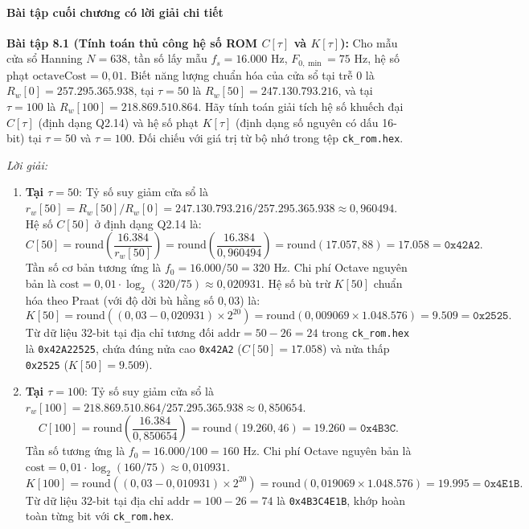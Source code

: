 \paragraph{Bài tập cuối chương có lời giải chi tiết}

\textbf{Bài tập 8.1 (Tính toán thủ công hệ số ROM $C[\tau]$ và $K[\tau]$):}
Cho mẫu cửa sổ Hanning $N = 638$, tần số lấy mẫu $f_s = 16.000\text{ Hz}$, $F_{0,\min} = 75\text{ Hz}$, hệ số phạt $\text{octaveCost} = 0{,}01$. Biết năng lượng chuẩn hóa của cửa sổ tại trễ 0 là $R_w[0] = 257.295.365.938$, tại $\tau = 50$ là $R_w[50] = 247.130.793.216$, và tại $\tau = 100$ là $R_w[100] = 218.869.510.864$. Hãy tính toán giải tích hệ số khuếch đại $C[\tau]$ (định dạng Q2.14) và hệ số phạt $K[\tau]$ (định dạng số nguyên có dấu 16-bit) tại $\tau = 50$ và $\tau = 100$. Đối chiếu với giá trị từ bộ nhớ trong tệp \texttt{ck\_rom.hex}.

\textit{Lời giải:}
\begin{enumerate}[leftmargin=1.5em]
    \item \textbf{Tại $\tau = 50$}:
    Tỷ số suy giảm cửa sổ là $r_w[50] = R_w[50] / R_w[0] = 247.130.793.216 / 257.295.365.938 \approx 0{,}960494$.
    Hệ số $C[50]$ ở định dạng Q2.14 là:
    \begin{equation}
        C[50] = \text{round}\left(\frac{16.384}{r_w[50]}\right) = \text{round}\left(\frac{16.384}{0{,}960494}\right) = \text{round}(17.057{,}88) = 17.058 = \texttt{0x42A2}.
    \end{equation}
    Tần số cơ bản tương ứng là $f_0 = 16.000 / 50 = 320\text{ Hz}$. Chi phí Octave nguyên bản là $\text{cost} = 0{,}01 \cdot \log_2(320 / 75) \approx 0{,}020931$.
    Hệ số bù trừ $K[50]$ chuẩn hóa theo Praat (với độ dời bù hằng số $0{,}03$) là:
    \begin{equation}
        K[50] = \text{round}\left((0{,}03 - 0{,}020931) \times 2^{20}\right) = \text{round}(0{,}009069 \times 1.048.576) = 9.509 = \texttt{0x2525}.
    \end{equation}
    Từ dữ liệu 32-bit tại địa chỉ tương đối $\text{addr} = 50 - 26 = 24$ trong \texttt{ck\_rom.hex} là \texttt{0x42A22525}, chứa đúng nửa cao \texttt{0x42A2} ($C[50] = 17.058$) và nửa thấp \texttt{0x2525} ($K[50] = 9.509$).
    \item \textbf{Tại $\tau = 100$}:
    Tỷ số suy giảm cửa sổ là $r_w[100] = 218.869.510.864 / 257.295.365.938 \approx 0{,}850654$.
    \begin{equation}
        C[100] = \text{round}\left(\frac{16.384}{0{,}850654}\right) = \text{round}(19.260{,}46) = 19.260 = \texttt{0x4B3C}.
    \end{equation}
    Tần số tương ứng là $f_0 = 16.000 / 100 = 160\text{ Hz}$. Chi phí Octave nguyên bản là $\text{cost} = 0{,}01 \cdot \log_2(160 / 75) \approx 0{,}010931$.
    \begin{equation}
        K[100] = \text{round}\left((0{,}03 - 0{,}010931) \times 2^{20}\right) = \text{round}(0{,}019069 \times 1.048.576) = 19.995 = \texttt{0x4E1B}.
    \end{equation}
    Từ dữ liệu 32-bit tại địa chỉ $\text{addr} = 100 - 26 = 74$ là \texttt{0x4B3C4E1B}, khớp hoàn toàn từng bit với \texttt{ck\_rom.hex}.
\end{enumerate}

